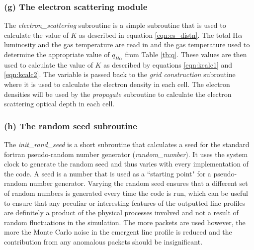 		\subsubsection{(g) The electron scattering module}
		The \textit{electron\_scattering} subroutine is a simple subroutine that is used to calculate the value of $K$ as described in equation \ref{eqn:es_distn}.  The total H$\alpha$ luminosity and the gas temperature are read in and the gas temperature used to determine the appropriate value of $q_{H\alpha}$ from Table \ref{tb:q}.  These values are then used to calculate the value of $K$ as described by equations \ref{eqn:kcalc1} and \ref{eqn:kcalc2}.  The variable is passed back to the \textit{grid construction} subroutine where it is used to calculate the electron density in each cell.  The electron densities will be used by the \textit{propagate} subroutine to calculate the electron scattering optical depth in each cell.
		
		\subsubsection{(h) The random seed subroutine}
		The \textit{init\_rand\_seed} is a short subroutine that calculates a seed for the standard {\sc fortran} pseudo-random number generator (\textit{random\_number}).  It uses the system clock to generate the random seed and thus varies with every implementation of the code.  A seed is a number that is used as a ``starting point" for a pseudo-random number generator.  Varying the random seed ensures that a different set of random numbers is generated every time the code is run, which can be useful to ensure that any peculiar or interesting features of the outputted line profiles are definitely a product of the physical processes involved and not a result of random fluctuations in the simulation.  The more packets are used however, the more the Monte Carlo noise in the emergent line profile is reduced and the contribution from any anomalous packets should be insignificant.
		
